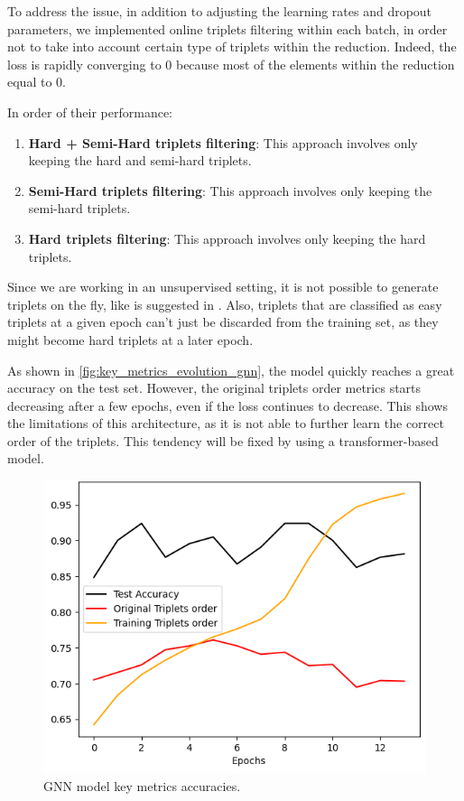 To address the issue, in addition to adjusting the learning rates and dropout parameters, we implemented online triplets filtering within each batch, in order not to take into account certain type of triplets within the reduction. Indeed, the loss is rapidly converging to 0 because most of the elements within the reduction equal to 0.


In order of their performance:
\begin{enumerate}
    \item \textbf{Hard + Semi-Hard triplets filtering}: This approach involves only keeping the hard and semi-hard triplets. 
    \item \textbf{Semi-Hard triplets filtering}: This approach involves only keeping the semi-hard triplets.
    \item \textbf{Hard triplets filtering}: This approach involves only keeping the hard triplets.
\end{enumerate}

Since we are working in an unsupervised setting, it is not possible to generate triplets on the fly, like is suggested in \cite{moindrotTripletLossOnline2018}. Also, triplets that are classified as easy triplets at a given epoch can't just be discarded from the training set, as they might become hard triplets at a later epoch.


As shown in \autoref{fig:key_metrics_evolution_gnn}, the model quickly reaches a great accuracy on the test set. However, the original triplets order metrics starts decreasing after a few epochs, even if the loss continues to decrease. This shows the limitations of this architecture, as it is not able to further learn the correct order of the triplets. This tendency will be fixed by using a transformer-based model.

\label{sec:graph-based-models}
\begin{figure}[h]
    \centering
    \includegraphics[width=0.5\columnwidth]{images/key_metrics_evolution_gnn.png}
    \caption{GNN model key metrics accuracies.}
    \label{fig:key_metrics_evolution_gnn}
\end{figure}

